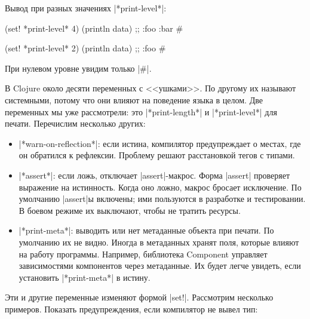 \noindent
Вывод при разных значениях \spverb|*print-level*|:

\begin{english}
  \begin{clojure}
(set! *print-level* 4)
(println data)
;; {:foo {:bar #}}

(set! *print-level* 2)
(println data)
;; {:foo #}
  \end{clojure}
\end{english}

\noindent
При нулевом уровне увидим только \spverb|#|.


В Clojure около десяти переменных с <<ушками>>. По другому их называют
системными, потому что они влияют на поведение языка в целом. Две переменных мы
уже рассмотрели: это \spverb|*print-length*| и \spverb|*print-level*| для
печати. Перечислим несколько других:

\begin{itemize}


\item
  \spverb|*warn-on-reflection*|: если истина, компилятор предупреждает о местах,
  где он обратился к рефлексии. Проблему решают расстановкой тегов с типами.


\item
  \spverb|*assert*|: если ложь, отключает \spverb|assert|-макрос. Форма
  \spverb|assert| проверяет выражение на истинность. Когда оно ложно, макрос
  бросает исключение.  По умолчанию \spverb|assert|ы включены; ими пользуются в
  разработке и тестировании. В боевом режиме их выключают, чтобы не тратить
  ресурсы.


\item
  \spverb|*print-meta*|: выводить или нет метаданные объекта при печати. По
  умолчанию их не видно. Иногда в метаданных хранят поля, которые влияют на
  работу программы. Например, библиотека Component управляет зависимостями
  компонентов через метаданные. Их будет легче увидеть, если установить
  \spverb|*print-meta*| в истину.

\end{itemize}

Эти и другие переменные изменяют формой \spverb|set!|. Рассмотрим несколько
примеров. Показать предупреждения, если компилятор не вывел тип:


